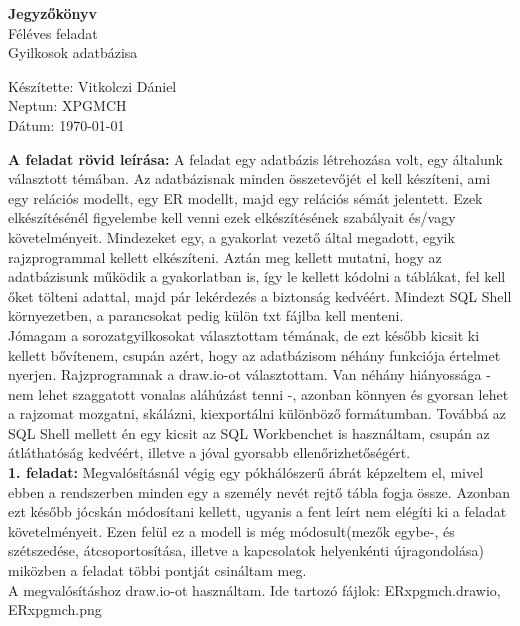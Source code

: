 \documentclass[12pt]{article}
\date{}
\begin{document}
\begin{titlepage}
\begin{center}
\textbf{\Huge Jegyzőkönyv}
\vspace{0.5cm}
\\ \Large Féléves feladat
\vspace{0.25cm}
\\ \Large Gyilkosok adatbázisa
\end{center}
\vspace{13cm}
\large Készítette: Vitkolczi Dániel \\
\large Neptun: XPGMCH \\
\large Dátum: \today
\end{titlepage}
\textbf{A feladat rövid leírása: } A feladat egy adatbázis létrehozása volt, egy általunk választott témában. Az adatbázisnak minden összetevőjét el kell készíteni, ami egy relációs modellt, egy ER modellt, majd egy relációs sémát jelentett. Ezek elkészítésénél figyelembe kell venni ezek elkészítésének szabályait és/vagy követelményeit. Mindezeket egy, a gyakorlat vezető által megadott, egyik rajzprogrammal kellett elkészíteni. Aztán meg kellett mutatni, hogy az adatbázisunk működik a gyakorlatban is, így le kellett kódolni a táblákat, fel kell őket tölteni adattal, majd pár lekérdezés a biztonság kedvéért. Mindezt SQL Shell környezetben, a parancsokat pedig külön txt fájlba kell menteni. \\
Jómagam a sorozatgyilkosokat választottam témának, de ezt később kicsit ki kellett bővítenem, csupán azért, hogy az adatbázisom néhány funkciója értelmet nyerjen. Rajzprogramnak a draw.io-ot választottam. Van néhány hiányossága - nem lehet szaggatott vonalas aláhúzást tenni -, azonban könnyen és gyorsan lehet a rajzomat mozgatni, skálázni, kiexportálni különböző formátumban. Továbbá az SQL Shell mellett én egy kicsit az SQL Workbenchet is használtam, csupán az átláthatóság kedvéért, illetve a jóval gyorsabb ellenőrizhetőségért. \\
\textbf{1. feladat:} Megvalósításnál végig egy pókhálószerű ábrát képzeltem el, mivel ebben a rendszerben minden egy a személy nevét rejtő tábla fogja össze. Azonban ezt később jócskán módosítani kellett, ugyanis a fent leírt nem elégíti ki a feladat követelményeit. Ezen felül ez a modell is még módosult(mezők egybe-, és szétszedése, átcsoportosítása, illetve a kapcsolatok helyenkénti újragondolása) miközben a feladat többi pontját csináltam meg. \\
A megvalósításhoz draw.io-ot használtam. Ide tartozó fájlok: ERxpgmch.drawio, ERxpgmch.png
\end{document}
